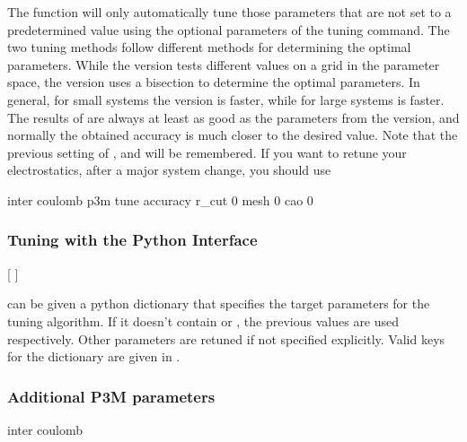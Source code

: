 The function will only automatically tune those parameters that are
not set to a predetermined value using the optional parameters of the
tuning command.
The two tuning methods follow different methods for determining the
optimal parameters. While the  version tests different
values on a grid in the parameter space, the  version
uses a bisection to determine the optimal parameters.  In general, for
small systems the  version is faster, while for large
systems  is faster. The results of 
are always at least as good as the parameters from the 
version, and normally the obtained accuracy is much closer to the
desired value.
Note that the previous setting of ,  and
 will be remembered.  If you want to retune your
electrostatics, \eg after a major system change, you should use
\begin{code}
  inter coulomb  p3m tune accuracy  r_cut 0 mesh 0 cao 0
\end{code}

\subsubsection{Tuning with the Python Interface}
\label{ssec:tunep3mPY}

\begin{pysyntax}
	[
    ]

	\begin{features}
	\end{features}
\end{pysyntax}

 can be given a python dictionary that specifies the target parameters for 
the tuning algorithm. If it doesn't contain  or
, the previous values are used respectively. Other parameters are 
retuned if not specified explicitly. Valid keys for the dictionary are given 
in .

\subsubsection{Additional P3M parameters}

\begin{essyntax}
  inter coulomb 
   
\end{essyntax}


